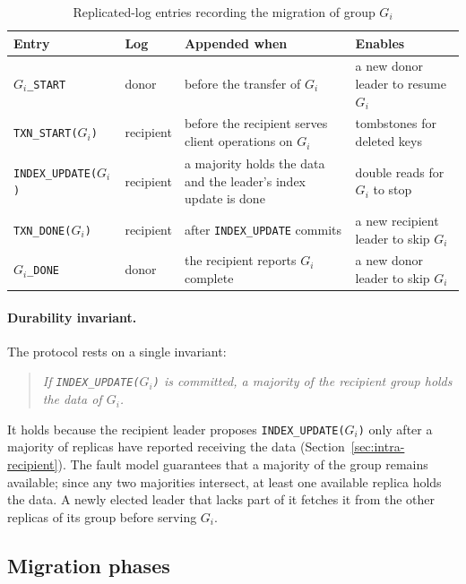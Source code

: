 \begin{table}[t]
  \centering
  \footnotesize
  \caption{Replicated-log entries recording the migration of group $G_i$}
  \label{tab:log-entries}
  \setlength{\tabcolsep}{3pt}
  \begin{tabular}{@{}l l >{\raggedright\arraybackslash}p{2.3cm} >{\raggedright\arraybackslash}p{2.2cm}@{}}
    \hline
    \textbf{Entry} & \textbf{Log} & \textbf{Appended when} & \textbf{Enables} \\
    \hline
    \texttt{$G_i$\_START}           & donor     & before the transfer of $G_i$ & a new donor leader to resume $G_i$ \\
    \texttt{TXN\_START($G_i$)}      & recipient & before the recipient serves client operations on $G_i$ & tombstones for deleted keys \\
    \texttt{INDEX\_UPDATE($G_i$)}   & recipient & a majority holds the data and the leader's index update is done & double reads for $G_i$ to stop \\
    \texttt{TXN\_DONE($G_i$)}       & recipient & after \texttt{INDEX\_UPDATE} commits & a new recipient leader to skip $G_i$ \\
    \texttt{$G_i$\_DONE}            & donor     & the recipient reports $G_i$ complete & a new donor leader to skip $G_i$ \\
    \hline
  \end{tabular}
\end{table}

\paragraph{Durability invariant.}
The protocol rests on a single invariant:
\begin{quote}
  \itshape If \texttt{INDEX\_UPDATE($G_i$)} is committed, a majority of the recipient group holds the data of $G_i$.
\end{quote}
It holds because the recipient leader proposes \texttt{INDEX\_UPDATE($G_i$)} only after a majority of replicas have reported receiving the data (Section~\ref{sec:intra-recipient}).
The fault model guarantees that a majority of the group remains available; since any two majorities intersect, at least one available replica holds the data.
A newly elected leader that lacks part of it fetches it from the other replicas of its group before serving $G_i$.

\subsection{Migration phases}
\label{sec:migration-phases}


